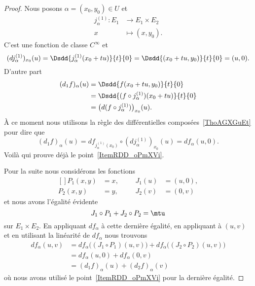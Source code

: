\begin{proof}
	Nous posons \( \alpha=(x_0,y_0)\in U\) et
	\begin{equation}
		\begin{aligned}
			j_{\alpha}^{(1)}\colon E_1 & \to E_1\times E_2 \\
			x                          & \mapsto (x,y_0).
		\end{aligned}
	\end{equation}
	C'est une fonction de classe \(  C^{\infty}\) et
	\begin{equation}
		(dj_{\alpha}^{(1)})_{x_0}(u)=\Dsdd{ j_{\alpha}^{(1)}(x_0+tu) }{t}{0}=\Dsdd{ (x_0+tu,y_0) }{t}{0}=(u,0).
	\end{equation}
	D'autre part
	\begin{subequations}
		\begin{align}
			(d_1f)_{\alpha}(u) & =\Dsdd{ f(x_0+tu,y_0) }{t}{0}                     \\
			                   & =\Dsdd{ (f\circ j_{\alpha}^{(1)})(x_0+tu) }{t}{0} \\
			                   & =\big( d(f\circ j_{\alpha}^{(1)}) \big)_{x_0}(u).
		\end{align}
	\end{subequations}
	À ce moment nous utilisons la règle des différentielles composées~\ref{ThoAGXGuEt} pour dire que
	\begin{equation}
		(d_1f)_{\alpha}(u)=df_{j_{\alpha}^{(1)}(x_0)}\circ (dj_{\alpha}^{(1)})_{x_0}(u)=df_{\alpha}(u,0).
	\end{equation}
	Voilà qui prouve déjà le point~\ref{ItemRDD_oPmXVi}.

	Pour la suite nous considérons les fonctions
	\begin{equation}
		\begin{aligned}[]
			P_1(x,y) & =x, &  &  & J_1(u) & =(u,0), \\
			P_2(x,y) & =y, &  &  & J_2(v) & =(0,v)
		\end{aligned}
	\end{equation}
	et nous avons l'égalité évidente
	\begin{equation}
		J_1\circ P_1+J_2\circ P_2=\mtu
	\end{equation}
	sur \( E_1\times E_2\). En appliquant \( df_{\alpha}\) à cette dernière égalité, en appliquant à \( (u,v)\) et en utilisant la linéarité de \( df_{\alpha}\) nous trouvons
	\begin{subequations}
		\begin{align}
			df_{\alpha}(u,v) & =df_{\alpha}\big( (J_1\circ P_1)(u,v) \big)+df_{\alpha}\big( (J_2\circ P_2)(u,v) \big) \\
			                 & =df_{\alpha}(u,0)+df_{\alpha}(0,v)                                                     \\
			                 & =(d_1f)_{\alpha}(u)+(d_2f)_{\alpha}(v)
		\end{align}
	\end{subequations}
	où nous avons utilisé le point~\ref{ItemRDD_oPmXVi} pour la dernière égalité.
\end{proof}

